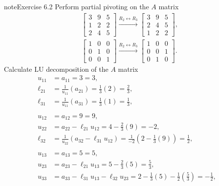 \documentclass[letterpaper,10pt,english]{jupyterBook}
\begin{document}
\begin{sphinxadmonition}{note}{Exercise 6.2}
\sphinxAtStartPar
Perform partial pivoting on the \(A\) matrix
\begin{align*}
    & \left[\begin{matrix}3 & 9 & 5\\1 & 2 & 2\\2 & 4 & 5\end{matrix}\right]
    \xrightarrow{R_{2} \leftrightarrow R_{3}}
    \left[\begin{matrix}3 & 9 & 5\\2 & 4 & 5\\1 & 2 & 2\end{matrix}\right]
    , \\
    & \left[\begin{matrix}1 & 0 & 0\\0 & 1 & 0\\0 & 0 & 1\end{matrix}\right]
    \xrightarrow{R_{2} \leftrightarrow R_{3}}
    \left[\begin{matrix}1 & 0 & 0\\0 & 0 & 1\\0 & 1 & 0\end{matrix}\right]
.
\end{align*}
\sphinxAtStartPar
Calculate LU decomposition of the \(A\) matrix
\begin{align*}
    u_{11} &= a_{11} = 3 = 3, \\
    \ell_{21} &= \frac{1}{u_{11}}\left(a_{21}\right) = \frac{1}{3}\left(2\right) = \frac{2}{3}, \\
    \ell_{31} &= \frac{1}{u_{11}}\left(a_{31}\right) = \frac{1}{3}\left(1\right) = \frac{1}{3}, \\
    \\
    u_{12} &= a_{12} = 9 = 9, \\
    u_{22} &= a_{22} - \ell_{21} u_{12} = 4 - \frac{2}{3}\left(9\right) = -2, \\
    \ell_{32} &= \frac{1}{u_{22}}\left(a_{32} - \ell_{31} u_{12}\right) = \frac{1}{-2}\left(2 - \frac{1}{3}\left(9\right)\right) = \frac{1}{2}, \\
    \\
    u_{13} &= a_{13} = 5 = 5, \\
    u_{23} &= a_{23} - \ell_{21} u_{13} = 5 - \frac{2}{3}\left(5\right) = \frac{5}{3}, \\
    u_{33} &= a_{33} - \ell_{31} u_{13} - \ell_{32} u_{23} = 2 - \frac{1}{3}\left(5\right) - \frac{1}{2}\left(\frac{5}{3}\right) = - \frac{1}{2}, \\
    \\

\end{align*}
\end{sphinxadmonition}
\end{document}
